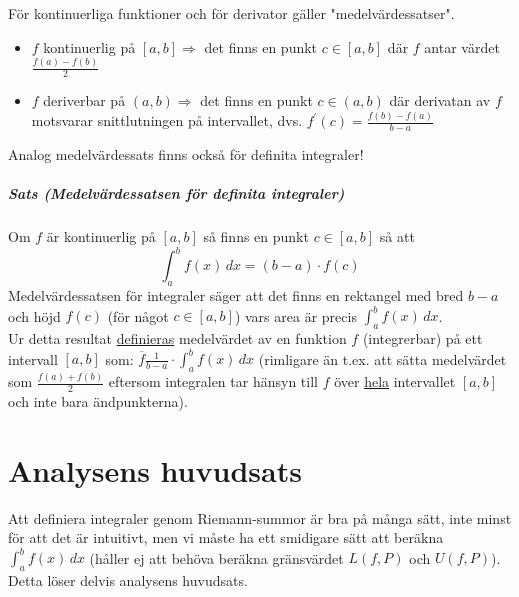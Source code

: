 För kontinuerliga funktioner och för derivator gäller "medelvärdessatser".
\begin{itemize}
    \item $f$ kontinuerlig på $[a,b] \Rightarrow$ det finns en punkt $c\in[a,b]$ där $f$ antar värdet $\frac{f(a)-f(b)}{2}$
    \item $f$ deriverbar på $(a,b)\Rightarrow$ det finns en punkt $c\in(a,b)$ där derivatan av $f$ motsvarar snittlutningen på intervallet,
          dvs. $f^\prime(c)=\frac{f(b)-f(a)}{b-a}$
\end{itemize}

Analog medelvärdessats finns också för definita integraler!

\paragraph*{Sats (Medelvärdessatsen för definita integraler)}
Om $f$ är kontinuerlig på $[a,b]$ så finns en punkt $c\in[a,b]$ så att
\begin{equation*}
    \int_a^b f(x)\, dx = (b-a) \cdot f(c)
\end{equation*}
Medelvärdessatsen för integraler säger att det finns en rektangel med bred $b-a$ och höjd $f(c)$ (för något $c\in[a,b]$) vars area är precis $\int_a^b f(x)\, dx$.\\
Ur detta resultat \underline{definieras} medelvärdet av en funktion $f$ (integrerbar) på ett intervall $[a,b]$ som:
$\overline{f}\frac{1}{b-a}\cdot \int_a^b f(x)\, dx$ (rimligare än t.ex. att sätta medelvärdet som $\frac{f(a)+f(b)}{2}$ eftersom integralen tar hänsyn till $f$ över \underline{hela} intervallet $[a,b]$ och inte bara ändpunkterna).

\chapter{Analysens huvudsats}
Att definiera integraler genom Riemann-summor är bra på många sätt, inte minst för att det är intuitivt, men vi måste ha ett smidigare sätt att beräkna $\int_a^b f(x)\, dx$ (håller ej att behöva beräkna gränsvärdet $L(f,P)$ och $U(f,P)$).
Detta löser delvis analysens huvudsats.

